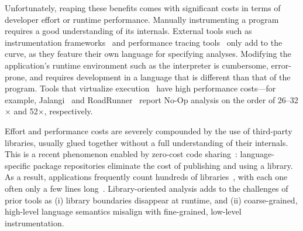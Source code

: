 \documentclass[letterpaper,twocolumn,10pt]{article}
\begin{document}

Unfortunately, reaping these benefits comes with significant costs in terms of developer effort or runtime performance.
Manually instrumenting a program requires a good understanding of its internals. %
External tools such as instrumentation frameworks~\cite{pin, valgrind} and performance tracing tools~\cite{perf, dtrace} only add to the curve, as they feature their own language for specifying analyses. %
Modifying the application's runtime environment such as the interpreter is cumbersome, error-prone, and requires development in a language that is different than that of the program.
Tools that virtualize execution~\cite{pin, valgrind, jalangi, roadrunner} have high performance costs---for example, Jalangi~\cite{jalangi} and RoadRunner~\cite{roadrunner} report No-Op analysis on the order of 26--32$\times$ and 52$\times$, respectively.

Effort and performance costs are severely compounded by the use of third-party libraries, usually glued together without a full understanding of their internals.
This is a recent phenomenon enabled by zero-cost code sharing~\cite{libs}:
  language-specific package repositories eliminate the cost of publishing and using a library.
As a result, applications frequently count hundreds of libraries~\cite{npmstudy:19}, with each one often only a few lines long~\cite{leftpad, npmstudy:19}. %
Library-oriented analysis adds to the challenges of prior tools as
  (i) library boundaries disappear at runtime, and
  (ii) coarse-grained, high-level language semantics misalign with fine-grained, low-level instrumentation.
\end{document}
